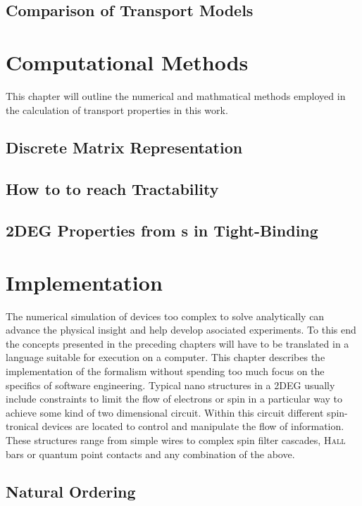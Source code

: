   \section{Comparison of Transport Models}
  
\chapter{Computational Methods}
This chapter will outline the numerical and mathmatical methods employed in the calculation of transport properties in this work.
  \section{Discrete Matrix Representation}\label{sec:discretematrixrep}
  
  \section{How to to reach Tractability}\label{sec:tractability}
  
  \section{2DEG Properties from \cgfnc s in Tight-Binding}\label{sec:observables}
  
\chapter{Implementation}
The numerical simulation of devices too complex to solve analytically can advance the physical insight and help develop asociated experiments. To this end the concepts presented in the preceding chapters will have to be translated in a language suitable for execution on a computer. This chapter describes the implementation of the \gfnc{} formalism without spending too much focus on the specifics of software engineering.
Typical nano structures in a 2DEG usually include constraints to limit the flow of electrons or spin in a particular way to achieve some kind of two dimensional circuit. Within this circuit different spin-tronical devices are located to control and manipulate the flow of information. These structures range from simple wires to complex spin filter cascades, \textsc{Hall} bars or quantum point contacts and any combination of the above.
\section{Natural Ordering}\label{sec:naruralordering}

